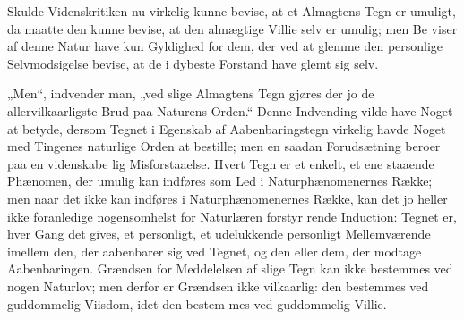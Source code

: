\documentclass[12pt]{book}
\begin{document}
Skulde Videnskritiken nu virkelig kunne bevise, at
et Almagtens Tegn er umuligt, da maatte den kunne
bevise, at den almægtige Villie selv er umulig; men Be\-%
viser af denne Natur have kun Gyldighed for dem, der
ved at glemme den personlige Selvmodsigelse bevise, at
de i dybeste Forstand have glemt sig selv.

„Men“, indvender man, „ved slige Almagtens Tegn
gjøres der jo de allervilkaarligste Brud paa Naturens
Orden.“ Denne Indvending vilde have Noget at betyde,
dersom Tegnet i Egenskab af Aabenbaringstegn virkelig
havde Noget med Tingenes naturlige Orden at bestille;
men en saadan Forudsætning beroer paa en videnskabe\-%
lig Misforstaaelse. Hvert Tegn er et enkelt, et ene\-%
staaende Phænomen, der umulig kan indføres som Led
i Naturphænomenernes Række; men naar det ikke kan
indføres i Naturphænomenernes Række, kan det jo heller
ikke foranledige nogensomhelst for Naturlæren forstyr\-%
rende Induction: Tegnet er, hver Gang det gives, et
personligt, et udelukkende personligt Mellemværende
imellem den, der aabenbarer sig ved Tegnet, og den
eller dem, der modtage Aabenbaringen. Grændsen for
Meddelelsen af slige Tegn kan ikke bestemmes ved nogen
Naturlov; men derfor er Grændsen ikke vilkaarlig: den
bestemmes ved guddommelig Viisdom, idet den bestem\-%
mes ved guddommelig Villie.
\end{document}
